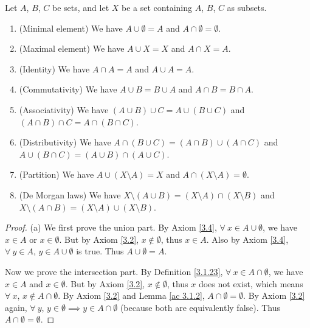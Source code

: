 \begin{proposition}\label{3.1.28}
Let \(A\), \(B\), \(C\) be sets, and let \(X\) be a set containing \(A\), \(B\), \(C\) as subsets.
    \begin{enumerate}
        \item (Minimal element) We have \(A \cup \emptyset = A\) and \(A \cap \emptyset = \emptyset\).
        \item (Maximal element) We have \(A \cup X = X\) and \(A \cap X = A\).
        \item (Identity) We have \(A \cap A = A\) and \(A \cup A = A\).
        \item (Commutativity) We have \(A \cup B = B \cup A\) and \(A \cap B = B \cap A\).
        \item (Associativity) We have \((A \cup B) \cup C = A \cup (B \cup C)\) and \((A \cap B) \cap C = A \cap (B \cap C)\).
        \item (Distributivity) We have \(A \cap (B \cup C) = (A \cap B) \cup (A \cap C)\) and \(A \cup (B \cap C) = (A \cup B) \cap (A \cup C)\).
        \item (Partition) We have \(A \cup (X \setminus A) = X\) and \(A \cap (X \setminus A) = \emptyset\).
        \item (De Morgan laws) We have \(X \setminus (A \cup B) = (X \setminus A) \cap (X \setminus B)\) and \(X \setminus (A \cap B) = (X \setminus A) \cup (X \setminus B)\).
    \end{enumerate}
\end{proposition}

\begin{proof}{(a)}
We first prove the union part.
By Axiom \ref{3.4}, \(\forall\ x \in A \cup \emptyset\), we have \(x \in A\) or \(x \in \emptyset\).
But by Axiom \ref{3.2}, \(x \notin \emptyset\), thus \(x \in A\).
Also by Axiom \ref{3.4}, \(\forall\ y \in A\), \(y \in A \cup \emptyset\) is true.
Thus \(A \cup \emptyset = A\).

Now we prove the intersection part.
By Definition \ref{3.1.23}, \(\forall\ x \in A \cap \emptyset\), we have \(x \in A\) and \(x \in \emptyset\).
But by Axiom \ref{3.2}, \(x \notin \emptyset\), thus \(x\) does not exist, which means \(\forall\ x\), \(x \notin A \cap \emptyset\).
By Axiom \ref{3.2} and Lemma \ref{ac 3.1.2}, \(A \cap \emptyset = \emptyset\).
By Axiom \ref{3.2} again, \(\forall\ y\), \(y \in \emptyset \implies y \in A \cap \emptyset\) (because both are equivalently false).
Thus \(A \cap \emptyset = \emptyset\).
\end{proof}

